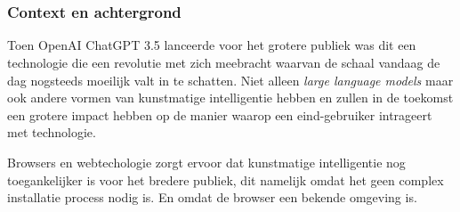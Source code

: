 
\chapter{}
\label{ch:inleiding}



\subsection{Context en achtergrond} %
Toen OpenAI ChatGPT 3.5 lanceerde voor het grotere publiek was dit een technologie die een revolutie met zich meebracht waarvan de schaal vandaag de dag nogsteeds moeilijk valt in te schatten. Niet alleen \textit{large language models} maar ook andere vormen van kunstmatige intelligentie hebben en zullen in de toekomst een grotere impact hebben op de manier waarop een eind-gebruiker intrageert met technologie.

\bigbreak{}

Browsers en webtechologie zorgt ervoor dat kunstmatige intelligentie nog toegankelijker is voor het bredere publiek, dit namelijk omdat het geen complex installatie process nodig is. En omdat de browser een bekende omgeving is.

